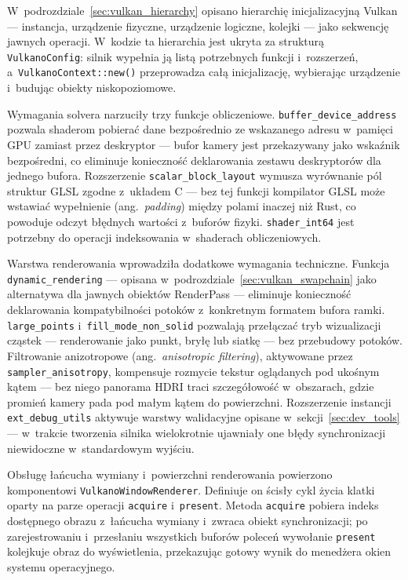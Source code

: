 W~podrozdziale~\ref{sec:vulkan_hierarchy} opisano hierarchię inicjalizacyjną
Vulkan --- instancja, urządzenie fizyczne, urządzenie logiczne, kolejki
--- jako sekwencję jawnych operacji. W~kodzie ta hierarchia jest ukryta
za strukturą \texttt{VulkanoConfig}: silnik wypełnia ją listą potrzebnych
funkcji i~rozszerzeń, a~\texttt{VulkanoContext::new()} przeprowadza całą
inicjalizację, wybierając urządzenie i~budując obiekty niskopoziomowe.

Wymagania solvera narzuciły trzy funkcje obliczeniowe.
\texttt{buffer\_device\_address} pozwala shaderom pobierać dane
bezpośrednio ze wskazanego adresu w~pamięci GPU zamiast przez deskryptor
--- bufor kamery jest przekazywany jako wskaźnik bezpośredni, co eliminuje
konieczność deklarowania zestawu deskryptorów dla jednego bufora. Rozszerzenie
\texttt{scalar\_block\_layout} wymusza wyrównanie pól struktur GLSL
zgodne z~układem C --- bez tej funkcji kompilator GLSL może wstawiać
wypełnienie (ang.~\textit{padding}) między polami inaczej niż Rust,
co powoduje odczyt błędnych wartości z~buforów fizyki.
\texttt{shader\_int64} jest potrzebny do operacji indeksowania
w~shaderach obliczeniowych.

Warstwa renderowania wprowadziła dodatkowe wymagania techniczne. Funkcja
\texttt{dynamic\_rendering} --- opisana w~podrozdziale~\ref{sec:vulkan_swapchain}
jako alternatywa dla jawnych obiektów RenderPass --- eliminuje konieczność
deklarowania kompatybilności potoków z~konkretnym formatem bufora ramki.
\texttt{large\_points} i~\texttt{fill\_mode\_non\_solid} pozwalają
przełączać tryb wizualizacji cząstek --- renderowanie jako punkt, bryłę
lub siatkę --- bez przebudowy potoków.
Filtrowanie anizotropowe (ang.~\textit{anisotropic filtering}),
aktywowane przez \texttt{sampler\_anisotropy}, kompensuje rozmycie
tekstur oglądanych pod ukośnym kątem --- bez niego panorama HDRI
traci szczegółowość w~obszarach, gdzie promień kamery pada pod małym
kątem do powierzchni.
Rozszerzenie instancji \texttt{ext\_debug\_utils} aktywuje warstwy
walidacyjne opisane w~sekcji~\ref{sec:dev_tools} --- w~trakcie tworzenia
silnika wielokrotnie ujawniały one błędy synchronizacji niewidoczne
w~standardowym wyjściu.

Obsługę łańcucha wymiany i~powierzchni renderowania powierzono komponentowi
\texttt{VulkanoWindowRenderer}\cite{vulkano-rs}. Definiuje on ścisły cykl
życia klatki oparty na parze operacji \texttt{acquire} i~\texttt{present}.
Metoda \texttt{acquire} pobiera indeks dostępnego obrazu z~łańcucha wymiany
i~zwraca obiekt synchronizacji; po zarejestrowaniu i~przesłaniu wszystkich
buforów poleceń wywołanie \texttt{present} kolejkuje obraz do wyświetlenia,
przekazując gotowy wynik do menedżera okien systemu operacyjnego.

